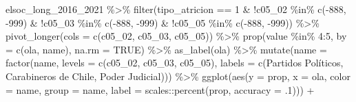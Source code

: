 \documentclass[
  12pt,
]{book}
\newenvironment{Shaded}{\begin{snugshade}}{\end{snugshade}}
\newcommand{\AttributeTok}[1]{\textcolor[rgb]{0.77,0.63,0.00}{#1}}
\newcommand{\ConstantTok}[1]{\textcolor[rgb]{0.00,0.00,0.00}{#1}}
\newcommand{\DecValTok}[1]{\textcolor[rgb]{0.00,0.00,0.81}{#1}}
\newcommand{\FunctionTok}[1]{\textcolor[rgb]{0.00,0.00,0.00}{#1}}
\newcommand{\NormalTok}[1]{#1}
\newcommand{\SpecialCharTok}[1]{\textcolor[rgb]{0.00,0.00,0.00}{#1}}
\newcommand{\StringTok}[1]{\textcolor[rgb]{0.31,0.60,0.02}{#1}}
\begin{document}
\begin{Shaded}
\begin{Highlighting}[]
\NormalTok{elsoc\_long\_2016\_2021 }\SpecialCharTok{\%\textgreater{}\%} 
  \FunctionTok{filter}\NormalTok{(tipo\_atricion }\SpecialCharTok{==} \DecValTok{1} \SpecialCharTok{\&} 
           \SpecialCharTok{!}\NormalTok{c05\_02 }\SpecialCharTok{\%in\%} \FunctionTok{c}\NormalTok{(}\SpecialCharTok{{-}}\DecValTok{888}\NormalTok{, }\SpecialCharTok{{-}}\DecValTok{999}\NormalTok{) }\SpecialCharTok{\&} \SpecialCharTok{!}\NormalTok{c05\_03 }\SpecialCharTok{\%in\%} \FunctionTok{c}\NormalTok{(}\SpecialCharTok{{-}}\DecValTok{888}\NormalTok{, }\SpecialCharTok{{-}}\DecValTok{999}\NormalTok{) }\SpecialCharTok{\&} \SpecialCharTok{!}\NormalTok{c05\_05 }\SpecialCharTok{\%in\%} \FunctionTok{c}\NormalTok{(}\SpecialCharTok{{-}}\DecValTok{888}\NormalTok{, }\SpecialCharTok{{-}}\DecValTok{999}\NormalTok{)) }\SpecialCharTok{\%\textgreater{}\%} 
  \FunctionTok{pivot\_longer}\NormalTok{(}\AttributeTok{cols =} \FunctionTok{c}\NormalTok{(c05\_02, c05\_03, c05\_05)) }\SpecialCharTok{\%\textgreater{}\%} 
  \FunctionTok{prop}\NormalTok{(value }\SpecialCharTok{\%in\%} \DecValTok{4}\SpecialCharTok{:}\DecValTok{5}\NormalTok{, }\AttributeTok{by =} \FunctionTok{c}\NormalTok{(ola, name), }\AttributeTok{na.rm =} \ConstantTok{TRUE}\NormalTok{) }\SpecialCharTok{\%\textgreater{}\%} 
  \FunctionTok{as\_label}\NormalTok{(ola) }\SpecialCharTok{\%\textgreater{}\%} 
  \FunctionTok{mutate}\NormalTok{(}\AttributeTok{name =} \FunctionTok{factor}\NormalTok{(name, }
                       \AttributeTok{levels =} \FunctionTok{c}\NormalTok{(}\StringTok{\textquotesingle{}c05\_02\textquotesingle{}}\NormalTok{, }\StringTok{\textquotesingle{}c05\_03\textquotesingle{}}\NormalTok{, }\StringTok{\textquotesingle{}c05\_05\textquotesingle{}}\NormalTok{),}
                       \AttributeTok{labels =} \FunctionTok{c}\NormalTok{(}\StringTok{\textquotesingle{}Partidos Políticos\textquotesingle{}}\NormalTok{, }
                                  \StringTok{\textquotesingle{}Carabineros de Chile\textquotesingle{}}\NormalTok{, }
                                  \StringTok{\textquotesingle{}Poder Judicial\textquotesingle{}}\NormalTok{))) }\SpecialCharTok{\%\textgreater{}\%}
  \FunctionTok{ggplot}\NormalTok{(}\FunctionTok{aes}\NormalTok{(}\AttributeTok{y =}\NormalTok{ prop, }\AttributeTok{x =}\NormalTok{ ola, }\AttributeTok{color =}\NormalTok{ name, }\AttributeTok{group =}\NormalTok{ name,}
               \AttributeTok{label =}\NormalTok{ scales}\SpecialCharTok{::}\FunctionTok{percent}\NormalTok{(prop, }\AttributeTok{accuracy =}\NormalTok{ .}\DecValTok{1}\NormalTok{))) }\SpecialCharTok{+}

\end{Highlighting}
\end{Shaded}
\end{document}
